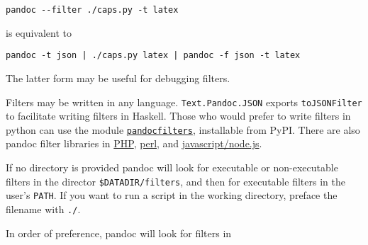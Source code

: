 \documentclass[]{article}
\begin{document}
\begin{description}
\begin{verbatim}
pandoc --filter ./caps.py -t latex
\end{verbatim}

is equivalent to

\begin{verbatim}
pandoc -t json | ./caps.py latex | pandoc -f json -t latex
\end{verbatim}

The latter form may be useful for debugging filters.

Filters may be written in any language. \texttt{Text.Pandoc.JSON}
exports \texttt{toJSONFilter} to facilitate writing filters in Haskell.
Those who would prefer to write filters in python can use the module
\href{https://github.com/jgm/pandocfilters}{\texttt{pandocfilters}},
installable from PyPI. There are also pandoc filter libraries in
\href{https://github.com/vinai/pandocfilters-php}{PHP},
\href{https://metacpan.org/pod/Pandoc::Filter}{perl}, and
\href{https://github.com/mvhenderson/pandoc-filter-node}{javascript/node.js}.

If no directory is provided pandoc will look for executable or
non-executable filters in the director \texttt{\$DATADIR/filters}, and
then for executable filters in the user's \texttt{PATH}. If you want to
run a script in the working directory, preface the filename with
\texttt{./}.

In order of preference, pandoc will look for filters in


\end{description}
\end{document}
